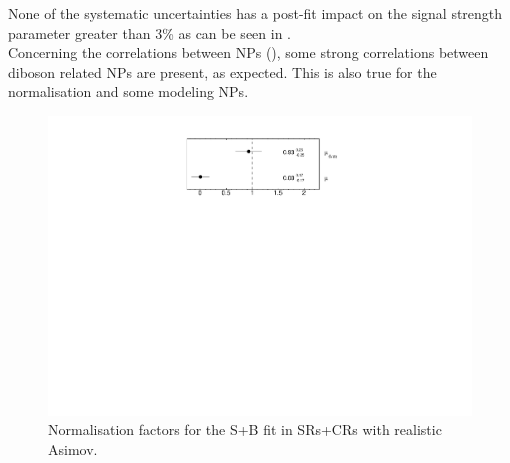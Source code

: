 None of the systematic uncertainties has a post-fit impact on the signal strength parameter greater than 3\% as can be seen in .\\
Concerning the correlations between NPs
(), some strong correlations
between diboson related NPs are present, as expected. This is also
true for the \ttbar normalisation and some \ttbar modeling NPs. 

\begin{figure}[htbp]
	\centering
	\includegraphics[width=.6\textwidth]{Chapters/CH8/figures/SPLUSB_CRSR_UsingDL1rcFullSys/NormFactors}
	\caption{Normalisation factors for the S+B \tZc fit in SRs+CRs with realistic Asimov.}%
	\label{fig:stat:tzc:splusb:crsr:norm}
\end{figure}

